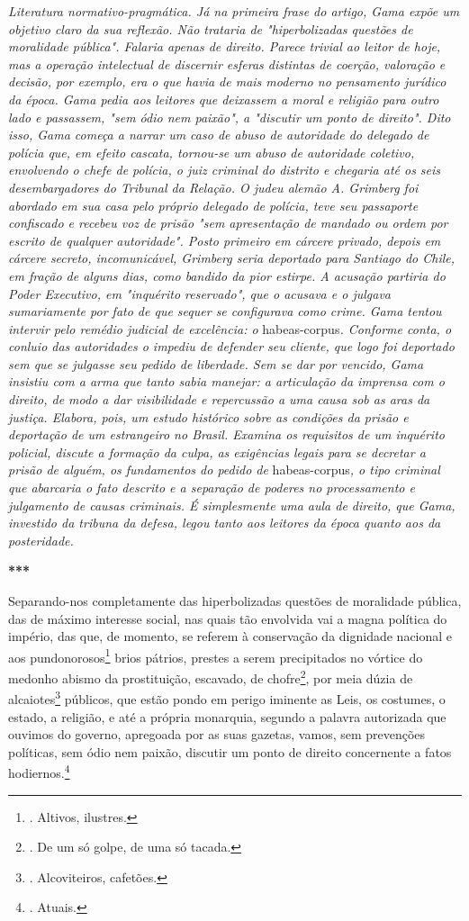 \emph{Literatura normativo-pragmática. Já na primeira frase do artigo,
Gama expõe um objetivo claro da sua reflexão. Não trataria de
"hiperbolizadas questões de moralidade pública". Falaria apenas de
direito. Parece trivial ao leitor de hoje, mas a operação intelectual de
discernir esferas distintas de coerção, valoração e decisão, por
exemplo, era o que havia de mais moderno no pensamento jurídico da
época. Gama pedia aos leitores que deixassem a moral e religião para
outro lado e passassem, "sem ódio nem paixão", a "discutir um ponto de
direito". Dito isso, Gama começa a narrar um caso de abuso de autoridade
do delegado de polícia que, em efeito cascata, tornou-se um abuso de
autoridade coletivo, envolvendo o chefe de polícia, o juiz criminal do
distrito e chegaria até os seis desembargadores do Tribunal da Relação.
O judeu alemão A. Grimberg foi abordado em sua casa pelo próprio
delegado de polícia, teve seu passaporte confiscado e recebeu voz de
prisão "sem apresentação de mandado ou ordem por escrito de qualquer
autoridade". Posto primeiro em cárcere privado, depois em cárcere
secreto, incomunicável, Grimberg seria deportado para Santiago do Chile,
em fração de alguns dias, como bandido da pior estirpe. A acusação
partiria do Poder Executivo, em "inquérito reservado", que o acusava e o
julgava sumariamente por fato de que sequer se configurava como crime.
Gama tentou intervir pelo remédio judicial de excelência: o}
habeas-corpus\emph{. Conforme conta, o conluio das autoridades o impediu
de defender seu cliente, que logo foi deportado sem que se julgasse seu
pedido de liberdade. Sem se dar por vencido, Gama insistiu com a arma
que tanto sabia manejar: a articulação da imprensa com o direito, de
modo a dar visibilidade e repercussão a uma causa sob as aras da
justiça. Elabora, pois, um estudo histórico sobre as condições da prisão
e deportação de um estrangeiro no Brasil. Examina os requisitos de um
inquérito policial, discute a formação da culpa, as exigências legais
para se decretar a prisão de alguém, os fundamentos do pedido de}
habeas-corpus\emph{, o tipo criminal que abarcaria o fato descrito e a
separação de poderes no processamento e julgamento de causas criminais.
É simplesmente uma aula de direito, que Gama, investido da tribuna da
defesa, legou tanto aos leitores da época quanto aos da posteridade.}

\textbf{***}

Separando-nos completamente das hiperbolizadas questões de moralidade
pública, das de máximo interesse social, nas quais tão envolvida vai a
magna política do império, das que, de momento, se referem à conservação
da dignidade nacional e aos pundonorosos\footnote{. Altivos, ilustres.}
brios pátrios, prestes a serem precipitados no vórtice do medonho abismo
da prostituição, escavado, de chofre\footnote{. De um só golpe, de uma
  só tacada.}, por meia dúzia de alcaiotes\footnote{. Alcoviteiros,
  cafetões.} públicos, que estão pondo em perigo iminente as Leis, os
costumes, o estado, a religião, e até a própria monarquia, segundo a
palavra autorizada que ouvimos do governo, apregoada por as suas
gazetas, vamos, sem prevenções políticas, sem ódio nem paixão, discutir
um ponto de direito concernente a fatos hodiernos.\footnote{. Atuais.}

